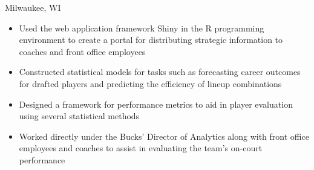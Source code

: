 \documentclass[11pt,a4paper,sans]{moderncv}        %
\begin{document}
  {}
  {Milwaukee, WI}
  {}
  {
    \begin{itemize}
      \item{Used the web application framework Shiny in the R programming environment to create a portal for distributing strategic information to coaches and front office employees}
      \item{Constructed statistical models for tasks such as forecasting career outcomes for drafted players and predicting the 
      efficiency of lineup combinations}
      \item{Designed a framework for performance metrics to aid in player evaluation using several statistical methods}
      \item{Worked directly under the Bucks' Director of Analytics along with front office employees and coaches to assist in evaluating 
      the team's on-court performance}
    \end{itemize}
  }

\clearpage
\end{document}
